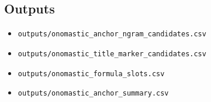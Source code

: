 \documentclass[11pt,a4paper]{article}
\begin{document}
\subsection*{Outputs}
\begin{itemize}
\item \texttt{outputs/onomastic\_anchor\_ngram\_candidates.csv}
\item \texttt{outputs/onomastic\_title\_marker\_candidates.csv}
\item \texttt{outputs/onomastic\_formula\_slots.csv}
\item \texttt{outputs/onomastic\_anchor\_summary.csv}
\end{itemize}
\end{document}
